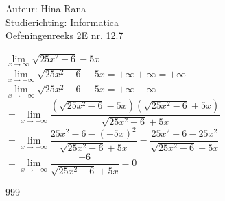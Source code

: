 \documentclass[a4paper]{article}
\begin{document}
\noindent \large Auteur: Hina Rana \\
\noindent \large Studierichting: Informatica\\
\noindent \large Oefeningenreeks 2E nr. 12.7\\

\medskip

\normalsize

$\lim\limits_{x \to \infty} \sqrt{25x^2-6}-5x$\\

$\lim\limits_{x \to -\infty} \sqrt{25x^2-6}-5x = + \infty + \infty = + \infty$\\

$\lim\limits_{x \to +\infty} \sqrt{25x^2-6}-5x = + \infty - \infty$\\

$=\lim\limits_{x \to +\infty} \dfrac{(\sqrt{25x^2-6}-5x)(\sqrt{25x^2-6}+5x)}{\sqrt{25x^2-6}+5x}$\\

$=\lim\limits_{x \to +\infty} \dfrac{25x^2-6-(-5x)^2}{\sqrt{25x^2-6}+5x} = \dfrac{25x^2-6-25x^2}{\sqrt{25x^2-6}+5x}$\\

$=\lim\limits_{x \to +\infty} \dfrac{-6}{\sqrt{25x^2-6}+5x} = 0$\\







\begin{thebibliography}{999}
\end{thebibliography}
\end{document}
